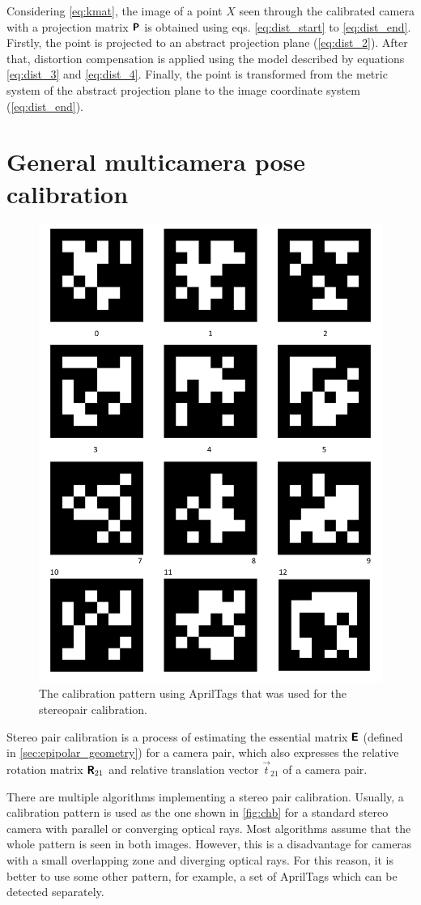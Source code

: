 Considering \autoref{eq:kmat}, the image of a point $X$ seen through the calibrated camera with a projection matrix $\pmb{\mathsf{P}}$ is obtained using eqs. \eqref{eq:dist_start} to \eqref{eq:dist_end}. 
Firstly, the point is projected to an abstract projection plane (\autoref{eq:dist_2}). 
After that, distortion compensation is applied using the model described by equations \eqref{eq:dist_3} and \eqref{eq:dist_4}. 
Finally, the point is transformed from the metric system of the abstract projection plane to the image coordinate system (\autoref{eq:dist_end}).

\section{General multicamera pose calibration}
\label{sec:stereocalib}

\begin{figure}[h]
    \centering
    \includegraphics[width=.2\textwidth]{graphics/aptags.png}
    \caption{The calibration pattern using AprilTags that was used for the stereopair calibration.}
    \label{fig:aptags}
\end{figure}

Stereo pair calibration is a process of estimating the essential matrix $\pmb{\mathsf{E}}$ (defined in \autoref{sec:epipolar_geometry}) for a camera pair, which also expresses the relative rotation matrix $\pmb{\mathsf{R}}_{21}$ and relative translation vector $\vec{t}_{21}$ of a camera pair. 

There are multiple algorithms implementing a stereo pair calibration.
Usually, a calibration pattern is used as the one shown in \autoref{fig:chb} for a standard stereo camera with parallel or converging optical rays.
Most algorithms assume that the whole pattern is seen in both images.
However, this is a disadvantage for cameras with a small overlapping zone and diverging optical rays.
For this reason, it is better to use some other pattern, for example, a set of AprilTags \cite{Malyuta2019} which can be detected separately. 

